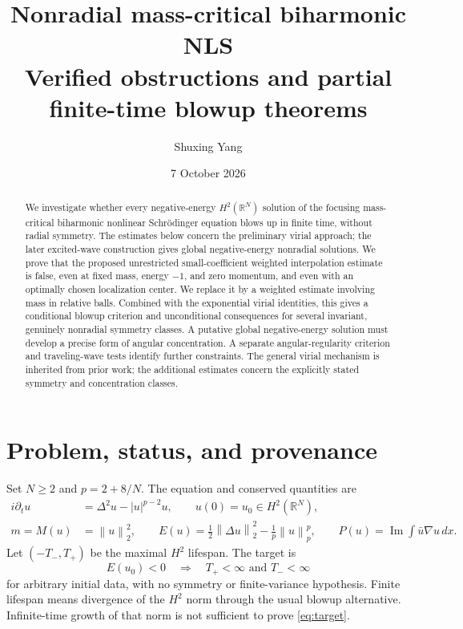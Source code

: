 \documentclass[11pt,a4paper]{article}
\title{Nonradial mass-critical biharmonic NLS\\[4pt]\large Verified obstructions and partial finite-time blowup theorems}
\author{Shuxing Yang}
\date{7 October 2026}
\theoremstyle{remark}\newtheorem{remark}[theorem]{Remark}
\newcommand{\R}{\mathbb R}
\newcommand{\dd}{\,dx}
\newcommand{\norm}[1]{\left\|#1\right\|}
\DeclareMathOperator{\Ima}{Im}
\begin{document}
\maketitle
\begin{abstract}
We investigate whether every negative-energy $H^2(\R^N)$ solution of the focusing mass-critical biharmonic nonlinear Schr\"odinger equation blows up in finite time, without radial symmetry. The estimates below concern the preliminary virial approach; the later excited-wave construction gives global negative-energy nonradial solutions. We prove that the proposed unrestricted small-coefficient weighted interpolation estimate is false, even at fixed mass, energy $-1$, and zero momentum, and even with an optimally chosen localization center. We replace it by a weighted estimate involving mass in relative balls. Combined with the exponential virial identities, this gives a conditional blowup criterion and unconditional consequences for several invariant, genuinely nonradial symmetry classes. A putative global negative-energy solution must develop a precise form of angular concentration. A separate angular-regularity criterion and traveling-wave tests identify further constraints. The general virial mechanism is inherited from prior work; the additional estimates concern the explicitly stated symmetry and concentration classes.
\end{abstract}

\section{Problem, status, and provenance}
Set $N\ge2$ and $p=2+8/N$. The equation and conserved quantities are
\begin{align}
 i\partial_tu&=\Delta^2u-|u|^{p-2}u,\qquad u(0)=u_0\in H^2(\R^N),\label{eq:pde}\\
 m=M(u)&=\norm{u}_2^2,\qquad
 E(u)=\frac12\norm{\Delta u}_2^2-\frac1p\norm{u}_p^p,\qquad
 P(u)=\Ima\int\bar u\nabla u\dd.\label{eq:energy}
\end{align}
Let $(-T_-,T_+)$ be the maximal $H^2$ lifespan. The target is
\begin{equation}\label{eq:target}
 E(u_0)<0\quad\Longrightarrow\quad T_+<\infty\text{ and }T_-<\infty
\end{equation}
for arbitrary initial data, with no symmetry or finite-variance hypothesis. Finite lifespan means divergence of the $H^2$ norm through the usual blowup alternative. Infinite-time growth of that norm is not sufficient to prove \eqref{eq:target}.
\end{document}
